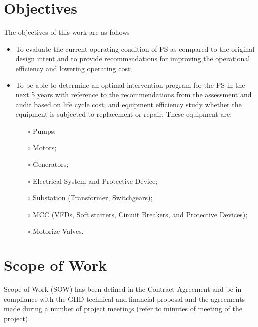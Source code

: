 

\section{Objectives}
The objectives of this work are as follows
\begin{itemize}
	\item To evaluate the current operating condition of PS as compared to the original design intent and to provide recommendations for improving the operational efficiency and lowering operating cost;
	\item To be able to determine an optimal intervention program for the PS in the next 5 years with reference to the recommendations from the assessment and audit based on life cycle cost; and equipment efficiency study whether the equipment is subjected to replacement or repair. These equipment are:
	\begin{itemize}
		\item[$\circ$] Pumps;
		\item[$\circ$] Motors;
		\item[$\circ$] Generators;
		\item[$\circ$] Electrical System and Protective Device;
		\item[$\circ$] Substation (Transformer, Switchgears);
		\item[$\circ$] MCC (VFDs, Soft starters, Circuit Breakers, and Protective Devices);
		\item[$\circ$] Motorize Valves.	
	\end{itemize}
\end{itemize}

\section{Scope of Work}
Scope of Work (SOW) has been defined in the Contract Agreement and be in compliance with the GHD technical and financial proposal and the agreements made during a number of project meetings (refer to minutes of meeting of the project). 

